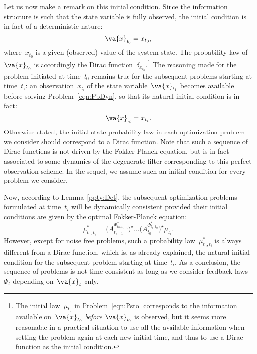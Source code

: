 \documentclass[a4paper]{amsart}
\theoremstyle{plain}
\theoremstyle{definition}
\theoremstyle{remark}
\begin{document}
Let us now make a remark on this initial condition. Since the
information structure is such that the state variable is fully
observed, the initial condition is in fact of a deterministic
nature:
\begin{equation*}
\va{x}_{t_{0}} = x_{t_{0}},
\end{equation*}
where~$x_{t_{0}}$ is a given (observed) value of the system state.
The probability law of~$\va{x}_{t_{0}}$ is accordingly the Dirac
function~$\delta_{x_{t_{0}}}$.\footnote{The initial
law~$\mu_{t_{0}}$ in Problem~\eqref{eqn:Psto} corresponds to the
information available on~$\va{x}_{t_{0}}$ \emph{before}
$\va{x}_{t_{0}}$ is observed, but it seems more reasonable in a
practical situation to use all the available information when
setting the problem again at each new initial time, and thus to
use a Dirac function as the initial condition.} The reasoning made
for the problem initiated at time~$t_{0}$ remains true for the
subsequent problems starting at time~$t_{i}$: an
observation~$x_{t_{i}}$ of the state variable~$\va{x}_{t_{i}}$
becomes available before solving Problem~\eqref{eqn:PbDyn}, so
that its natural initial condition is in fact:
\begin{equation*}
\va{x}_{t_{i}} = x_{t_{i}}.
\end{equation*}
Otherwise stated, the initial state probability law in each
optimization problem we consider should correspond to a Dirac
function. Note that such a sequence of Dirac functions is not
driven by the Fokker-Planck equation, but is in fact associated to
some dynamics of the degenerate filter corresponding to this
perfect observation scheme. In the sequel, we assume such an
initial condition for every problem we consider.

Now, according to Lemma~\ref{ppty:Det}, the subsequent
optimization problems formulated at time~$t_{i}$ will be
dynamically consistent provided their initial conditions are given
by the optimal Fokker-Planck equation:
\begin{equation*}
\mu_{t_0, t_{i}}^* =
\Big(A_{t_{i-1}}^{\Phi_{t_{0},t_{i-1}}^*}\Big)^\star \ldots
\Big(A_{t_{0}}^{\Phi_{t_{0},t_{0}}^*}\Big)^\star \mu_{t_0}.
\end{equation*}
However, except for noise free problems, such a probability
law~$\mu_{t_0, t_{i}}^*$ is always different from a Dirac
function, which is, as already explained, the natural initial
condition for the subsequent problem starting at time~$t_{i}$. As
a conclusion, the sequence of problems is not time consistent as
long as we consider feedback laws~$\Phi_{t}$ depending
on~$\va{x}_{t}$ only.
\end{document}
